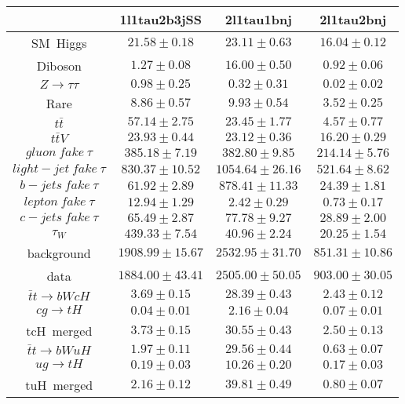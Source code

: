 \centering
\begin{tabular}{|c|c|c|c|} \hline
 & 1l1tau2b3jSS & 2l1tau1bnj & 2l1tau2bnj\\\hline
SM~Higgs & $21.58\pm0.18$ & $23.11\pm0.63$ & $16.04\pm0.12$\\\hline
Diboson & $1.27\pm0.08$ & $16.00\pm0.50$ & $0.92\pm0.06$\\\hline
$Z\to\tau\tau$ & $0.98\pm0.25$ & $0.32\pm0.31$ & $0.02\pm0.02$\\\hline
Rare & $8.86\pm0.57$ & $9.93\pm0.54$ & $3.52\pm0.25$\\\hline
$t\bar{t}$ & $57.14\pm2.75$ & $23.45\pm1.77$ & $4.57\pm0.77$\\\hline
$t\bar{t}V$ & $23.93\pm0.44$ & $23.12\pm0.36$ & $16.20\pm0.29$\\\hline
$gluon~fake~\tau$ & $385.18\pm7.19$ & $382.80\pm9.85$ & $214.14\pm5.76$\\\hline
$light-jet~fake~\tau$ & $830.37\pm10.52$ & $1054.64\pm26.16$ & $521.64\pm8.62$\\\hline
$b-jets~fake~\tau$ & $61.92\pm2.89$ & $878.41\pm11.33$ & $24.39\pm1.81$\\\hline
$lepton~fake~\tau$ & $12.94\pm1.29$ & $2.42\pm0.29$ & $0.73\pm0.17$\\\hline
$c-jets~fake~\tau$ & $65.49\pm2.87$ & $77.78\pm9.27$ & $28.89\pm2.00$\\\hline
$\tau_{W}$ & $439.33\pm7.54$ & $40.96\pm2.24$ & $20.25\pm1.54$\\\hline
background & $1908.99\pm15.67$ & $2532.95\pm31.70$ & $851.31\pm10.86$\\\hline
data & $1884.00\pm43.41$ & $2505.00\pm50.05$ & $903.00\pm30.05$\\\hline
$\bar{t}t\to bWcH$ & $3.69\pm0.15$ & $28.39\pm0.43$ & $2.43\pm0.12$\\\hline
$cg\to tH$ & $0.04\pm0.01$ & $2.16\pm0.04$ & $0.07\pm0.01$\\\hline
tcH~merged & $3.73\pm0.15$ & $30.55\pm0.43$ & $2.50\pm0.13$\\\hline
$\bar{t}t\to bWuH$ & $1.97\pm0.11$ & $29.56\pm0.44$ & $0.63\pm0.07$\\\hline
$ug\to tH$ & $0.19\pm0.03$ & $10.26\pm0.20$ & $0.17\pm0.03$\\\hline
tuH~merged & $2.16\pm0.12$ & $39.81\pm0.49$ & $0.80\pm0.07$\\\hline
\end{tabular}
